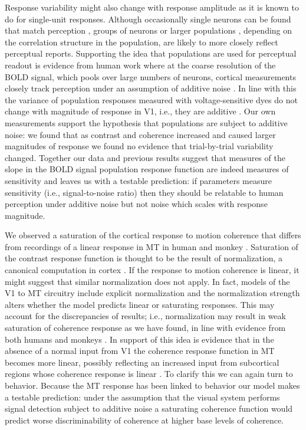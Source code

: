 \documentclass{report}
\begin{document}
Response variability might also change with response amplitude as it is known to do for single-unit responses. Although occasionally single neurons can be found that match perception \citep{Britten1992-xy}, groups of neurons \citep{Tolhurst1983-cv} or larger populations \citep{Averbeck2006-zc,Zohary1994-sv}, depending on the correlation structure in the population, are likely to more closely reflect perceptual reports. Supporting the idea that populations are used for perceptual readout is evidence from human work where at the coarse resolution of the BOLD signal, which pools over large numbers of neurons, cortical measurements closely track perception under an assumption of additive noise \citep{Boynton1999-jd,Hara2014-mv,Pestilli2011-gi,Sapir2005-ri}. In line with this the variance of population responses measured with voltage-sensitive dyes do not change with magnitude of response in V1, i.e., they are additive \citep{Chen2006-tt}. Our own measurements support the hypothesis that populations are subject to additive noise: we found that as contrast and coherence increased and caused larger magnitudes of response we found no evidence that trial-by-trial variability changed. Together our data and previous results suggest that measures of the slope in the BOLD signal population response function are indeed measures of sensitivity and leaves us with a testable prediction: if parameters measure sensitivity (i.e., signal-to-noise ratio) then they should be relatable to human perception under additive noise but not noise which scales with response magnitude.

We observed a saturation of the cortical response to motion coherence that differs from recordings of a linear response in MT in human \citep{Handel2007-xk,Rees2000-ul} and monkey \citep{Britten1993-oh}. Saturation of the contrast response function is thought to be the result of normalization, a canonical computation in cortex \citep{Baker2017-vw,Carandini2011-va}. If the response to motion coherence is linear, it might suggest that similar normalization does not apply. In fact, models of the V1 to MT circuitry include explicit normalization \citep{Simoncelli1998-ts} and the normalization strength alters whether the model predicts linear or saturating responses. This may account for the discrepancies of results; i.e., normalization may result in weak saturation of coherence response as we have found, in line with evidence from both humans \citep{Costagli2014-kg,Rees2000-ul} and monkeys \citep{Britten1993-oh}. In support of this idea is evidence that in the absence of a normal input from V1 the coherence response function in MT becomes more linear, possibly reflecting an increased input from subcortical regions whose coherence response is linear \citep{Ajina2015-xm}. To clarify this we can again turn to behavior. Because the MT response has been linked to behavior \citep{Katz2016-xc} our model makes a testable prediction: under the assumption that the visual system performs signal detection subject to additive noise \citep{Boynton1999-jd} a saturating coherence function would predict worse discriminability of coherence at higher base levels of coherence.
\end{document}
